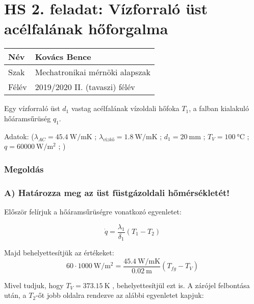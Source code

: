 
\section*{HS 2. feladat: Vízforraló üst acélfalának hőforgalma}

\begin{tabular}{ | p{2cm} | p{14cm} | } 
	\hline
	Név & Kovács Bence \\ 
	\hline
	Szak &  Mechatronikai mérnöki alapszak\\
	\hline
	Félév & 2019/2020 II. (tavaszi) félév \\ 
	\hline
\end{tabular}
\vspace{0.5cm}


Egy vízforraló üst $d_1$ vastag acélfalának vízoldali hőfoka $T_1$, a falban kialakuló hőáramsűrüség $q_1$.

\noindent Adatok:    
($\lambda_{AC} = \SI{45.4}{\watt\per\meter\kelvin}$ ;
$\lambda_{\textit{vízkő}} = \SI{1,8}{\watt\per\meter\kelvin}$ ; 
$d_1 = \SI{20}{\milli\meter}$ ; 
$T_V = \SI{100}{\celsius} $ ; 
$q = \SI{60000}{\watt\per\meter\squared}$ ; )

\vspace{2mm}

\subsubsection*{Megoldás}


\subsubsection*{A) Határozza meg az üst füstgázoldali hőmérsékletét!}


Először felírjuk a hőáramsűrüségre vonatkozó egyenletet:

\begin{equation}
	 \dot{q} = \frac{\lambda_1}{\delta_1} (T_1 - T_2)
\end{equation}


Majd behelyettesítjük az értékeket:
\begin{equation}
60 \cdot \SI{1000}{\watt\per\meter\squared} =  \frac{\SI{45.4}{\watt\per\meter\kelvin}}{\SI{0.02}{\meter}} (T_{fg} - T_V)
\end{equation}

Mivel tudjuk, hogy $T_V = \SI{373.15}{\kelvin}$ , behelyettesítjül ezt is.
A zárójel felbontása után, a $T_2$-őt jobb oldalra rendezve az alábbi egyenletet kapjuk:

